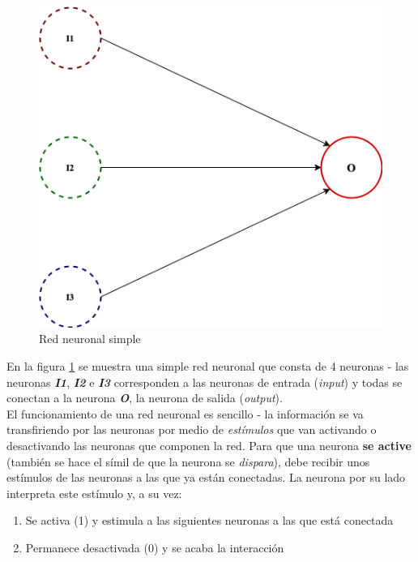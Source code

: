 \begin{figure}[h]
    \centering
    \includegraphics[scale=0.35]{cap2_contextualizacion/images/red_neuronal.png}
    \caption{Red neuronal simple}
    \label{fig:red_neuronal_simple}
\end{figure}

En la figura \ref{fig:red_neuronal_simple} se muestra una simple red neuronal que consta de 4 neuronas - las neuronas \textbf{\textit{I1}}, \textbf{\textit{I2}} e \textbf{\textit{I3}} corresponden a las neuronas de entrada (\textit{input}) y todas se conectan a la neurona \textbf{\textit{O}}, la neurona de salida (\textit{output}). \\

El funcionamiento de una red neuronal es sencillo - la información se va transfiriendo por las neuronas por medio de \textit{estímulos} que van activando o desactivando las neuronas que componen la red. Para que una neurona \textbf{se active} (también se hace el símil de que la neurona se \textit{dispara}), debe recibir unos estímulos de las neuronas a las que ya están conectadas. La neurona por su lado interpreta este estímulo y, a su vez:

\begin{enumerate}
    \item Se activa (1) y estimula a las siguientes neuronas a las que está conectada
    \item Permanece desactivada (0) y se acaba la interacción 
\end{enumerate}

